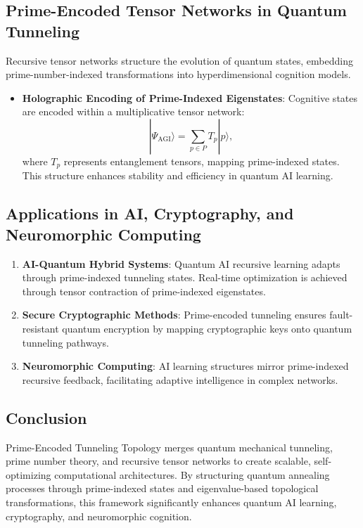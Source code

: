 \documentclass{article}
\theoremstyle{plain}
\begin{document}
\subsection{Prime-Encoded Tensor Networks in Quantum Tunneling}
Recursive tensor networks structure the evolution of quantum states, embedding prime-number-indexed transformations into hyperdimensional cognition models.

\begin{itemize}
    \item \textbf{Holographic Encoding of Prime-Indexed Eigenstates}: Cognitive states are encoded within a multiplicative tensor network:
    \begin{equation}
        |\Psi_{\text{AGI}}\rangle = \sum_{p \in P} T_p |p\rangle,
    \end{equation}
    where $T_p$ represents entanglement tensors, mapping prime-indexed states. This structure enhances stability and efficiency in quantum AI learning.
\end{itemize}

\subsection{Applications in AI, Cryptography, and Neuromorphic Computing}
\begin{enumerate}
    \item \textbf{AI-Quantum Hybrid Systems}: Quantum AI recursive learning adapts through prime-indexed tunneling states. Real-time optimization is achieved through tensor contraction of prime-indexed eigenstates.
    \item \textbf{Secure Cryptographic Methods}: Prime-encoded tunneling ensures fault-resistant quantum encryption by mapping cryptographic keys onto quantum tunneling pathways.
    \item \textbf{Neuromorphic Computing}: AI learning structures mirror prime-indexed recursive feedback, facilitating adaptive intelligence in complex networks.
\end{enumerate}

\subsection{Conclusion}
Prime-Encoded Tunneling Topology merges quantum mechanical tunneling, prime number theory, and recursive tensor networks to create scalable, self-optimizing computational architectures. By structuring quantum annealing processes through prime-indexed states and eigenvalue-based topological transformations, this framework significantly enhances quantum AI learning, cryptography, and neuromorphic cognition.
\end{document}
